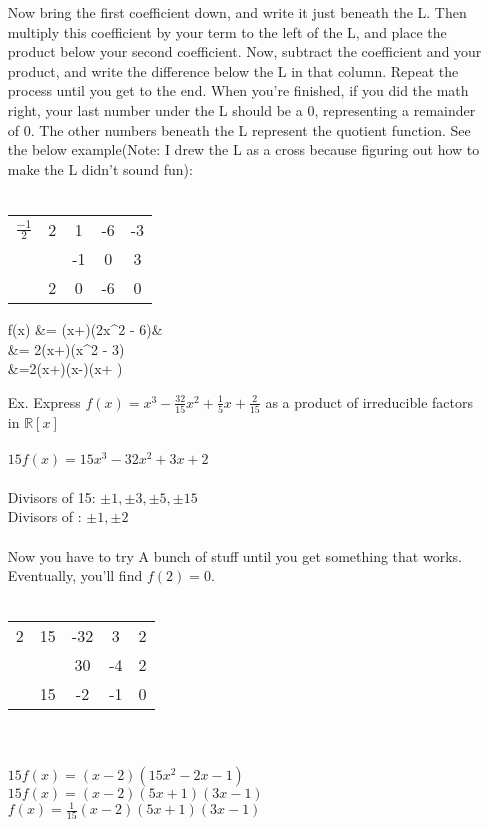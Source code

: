 \documentclass{letter}
\begin{document}
\begin{itemize}
		Now bring the first coefficient down, and write it just beneath the L. Then multiply this coefficient by your term to the left of the L, and place the product below your second coefficient. Now, subtract the coefficient and your product, and write the difference below the L in that column. Repeat the process until you get to the end. When you're finished, if you did the math right, your last number under the L should be a 0, representing a remainder of 0. The other numbers beneath the L represent the quotient function. See the below example(Note: I drew the L as a cross because figuring out how to make the L didn't sound fun):\\\\
		\begin{tabular}{c|c c c c}
			$\frac{-1}{2}$&2&1&-6&-3\\
			&&-1&0&3\\
			\hline
			&2&0&-6&0
		\end{tabular}
		\begin{flalign*}
			f(x) &= (x+)(2x^2 - 6)&\\
			&= 2(x+)(x^2 - 3)\\
			&=2(x+)(x-\sqrt 3)(x+ )
		\end{flalign*}
		\clearpage
		\item[Ex. ] Express $f(x) = x^3 - \frac{32}{15}x^2 + \frac{1}{5}x + \frac{2}{15}$ as a product of irreducible factors in $\mathbb{R} \left[ x \right]$\\\\
		$15f(x) = 15x^3 - 32x^2 + 3x + 2$\\\\
		Divisors of 15: $\pm 1, \pm 3, \pm 5, \pm 15$\\
		Divisors of : $\pm 1, \pm 2$\\\\
		Now you have to try A bunch of stuff until you get something that works. Eventually, you'll find $f(2) = 0$.\\\\
		\begin{tabular}{c|c c c c}
			2&15&-32&3&2\\
			&&30&-4&2\\
			\hline
			&15&-2&-1&0
		\end{tabular}\\\\
		$15f(x) = (x-2)(15x^2 - 2x - 1)$\\
		$15f(x) = (x-2)(5x+1)(3x-1)$\\
		$f(x) = \frac{1}{15}(x-2)(5x+1)(3x-1)$\\
		

\end{itemize}
\end{document}
